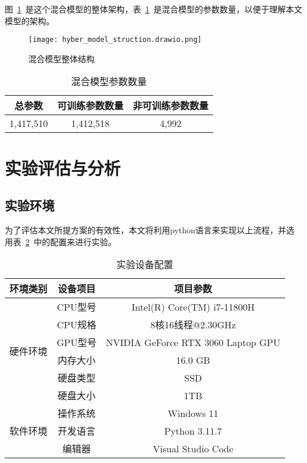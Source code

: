 图~\ref{fig:hyber_model_struct}~是这个混合模型的整体架构，表~\ref{tab:model_params}~是混合模型的参数数量，以便于理解本文模型的架构。
\begin{figure}[htbp]
  \centering
  \texttt{[image: hyber\_model\_struction.drawio.png]}
  \caption{混合模型整体结构}
  \label{fig:hyber_model_struct}
\end{figure}



\begin{table}[htbp]
  \label{tab:model_params}
  \caption{混合模型参数数量}
  \centering
  \begin{tabular}{ccc}
    \toprule
    \textbf{总参数} & \textbf{可训练参数数量} & \textbf{非可训练参数数量}\\
    \midrule
    1,417,510 & 1,412,518 & 4,992\\
    \bottomrule
  \end{tabular}
\end{table}

\section{实验评估与分析}
\subsection{实验环境}
为了评估本文所提方案的有效性，本文将利用python语言来实现以上流程，并选用表~\ref{tab:env_setting}~中的配置来进行实验。

\begin{table}[htbp]
  \caption{实验设备配置}
  \label{tab:env_setting}
  \centering
  \begin{tabular}{ccc}
    \toprule
    \textbf{环境类别} & \textbf{设备项目} & \textbf{项目参数}\\
    \midrule
    \multirow{6}{*}{硬件环境}& CPU型号 & Intel(R) Core(TM) i7-11800H\\
                            & CPU规格 & 8核16线程@2.30GHz\\
                            & GPU型号 & NVIDIA GeForce RTX 3060 Laptop GPU\\
                            & 内存大小& 16.0 GB\\
                            & 硬盘类型& SSD\\
                            & 硬盘大小& 1TB\\
                            \hline
    \multirow{3}{*}{软件环境}&操作系统&Windows 11\\
                            &开发语言&Python 3.11.7\\
                            &编辑器 &Visual Studio Code\\                       
    \bottomrule
  \end{tabular}
\end{table}

